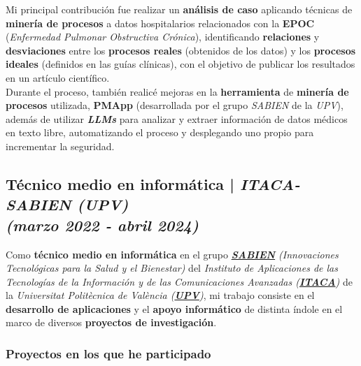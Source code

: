 \documentclass[letterpaper, 12pt, dvipsnames]{article}
\newcommand{\upvName}{Universitat Politècnica de València}
\newcommand{\upv}{UPV}
\newcommand{\upvUrl}{https://www.upv.es/es}
\newcommand{\sabien}{SABIEN}
\newcommand{\itacaSabien}{ITACA-SABIEN}
\newcommand{\itacaSabienUpv}{{\itacaSabien} (\upv)}
\newcommand{\sabienUrl}{http://www.sabien.upv.es/}
\begin{document}
Mi principal contribución fue realizar un \textbf{análisis de caso} aplicando técnicas de \textbf{minería de procesos} a datos hospitalarios relacionados con la \textbf{EPOC} (\emph{Enfermedad Pulmonar Obstructiva Crónica}), identificando \textbf{relaciones} y \textbf{desviaciones} entre los \textbf{procesos reales} (obtenidos de los datos) y los \textbf{procesos ideales} (definidos en las guías clínicas), con el objetivo de publicar los resultados en un artículo científico.\\

Durante el proceso, también realicé mejoras en la \textbf{herramienta} de \textbf{minería de procesos} utilizada, \textbf{PMApp} (desarrollada por el grupo \emph{\sabien} de la \emph{\upv}), además de utilizar \textbf{\emph{LLMs}} para analizar y extraer información de datos médicos en texto libre, automatizando el proceso y desplegando uno propio para incrementar la seguridad.

\subsection*{Técnico medio en informática | \emph{\itacaSabienUpv}\\\textit{\large (marzo 2022 - abril 2024)}}

Como \textbf{técnico medio en informática} en el grupo \emph{\textbf{\href{\sabienUrl}{\sabien}} (Innovaciones Tecnológicas para la Salud y el Bienestar)} del \emph{Instituto de Aplicaciones de las Tecnologías de la Información y de las Comunicaciones Avanzadas (\textbf{\href{http://www.itaca.upv.es/}{ITACA}})} de la \emph{{\upvName} (\textbf{\href{\upvUrl}{\upv}})}, mi trabajo consiste en el \textbf{desarrollo de aplicaciones} y el \textbf{apoyo informático} de distinta índole en el marco de diversos \textbf{proyectos de investigación}.

\subsubsection*{Proyectos en los que he participado}

\vspace{1em}
\end{document}
